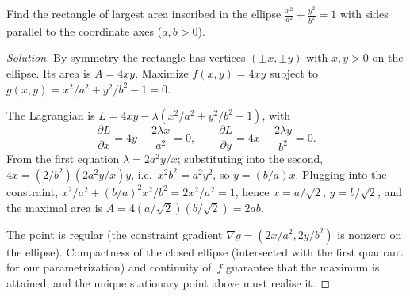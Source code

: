 \begin{problem}
\label{prob:rectangle-ellipse}
Find the rectangle of largest area inscribed in the ellipse
$\frac{x^2}{a^2} + \frac{y^2}{b^2} = 1$ with sides parallel to the
coordinate axes ($a, b > 0$).
\end{problem}

\begin{proof}[Solution]
By symmetry the rectangle has vertices $(\pm x, \pm y)$ with
$x, y > 0$ on the ellipse. Its area is $A = 4xy$. Maximize
$f(x, y) = 4xy$ subject to $g(x, y) = x^2/a^2 + y^2/b^2 - 1 = 0$.

The Lagrangian is $L = 4xy - \lambda(x^2/a^2 + y^2/b^2 - 1)$,
with
\[
  \frac{\partial L}{\partial x} = 4y - \frac{2\lambda x}{a^2} = 0,
  \qquad
  \frac{\partial L}{\partial y} = 4x - \frac{2\lambda y}{b^2} = 0.
\]
From the first equation $\lambda = 2 a^2 y / x$; substituting into the
second, $4x = (2/b^2)(2 a^2 y / x) y$, i.e.\
$x^2 b^2 = a^2 y^2$, so $y = (b/a) x$. Plugging into the constraint,
$x^2/a^2 + (b/a)^2 x^2 / b^2 = 2 x^2 / a^2 = 1$, hence
$x = a/\sqrt{2}$, $y = b/\sqrt{2}$, and the maximal area is
$A = 4 (a/\sqrt{2})(b/\sqrt{2}) = 2 a b$.

The point is regular (the constraint gradient
$\nabla g = (2x/a^2, 2y/b^2)$ is nonzero on the ellipse). Compactness
of the closed ellipse (intersected with the first quadrant for our
parametrization) and continuity of~$f$ guarantee that the maximum is
attained, and the unique stationary point above must realise it.
\end{proof}
